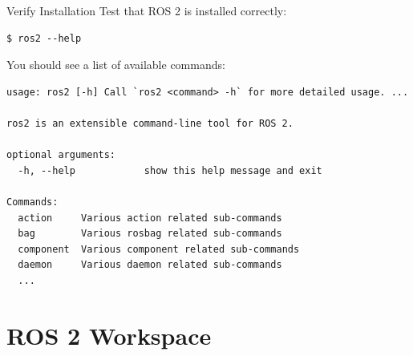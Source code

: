 \begin{frame}[fragile]{Verify Installation}
    Test that ROS 2 is installed correctly:

    \begin{lstlisting}[language=shell]
$ ros2 --help
\end{lstlisting}

    You should see a list of available commands:
    \begin{lstlisting}[language=output]
usage: ros2 [-h] Call `ros2 <command> -h` for more detailed usage. ...

ros2 is an extensible command-line tool for ROS 2.

optional arguments:
  -h, --help            show this help message and exit

Commands:
  action     Various action related sub-commands
  bag        Various rosbag related sub-commands
  component  Various component related sub-commands
  daemon     Various daemon related sub-commands
  ...
\end{lstlisting}
\end{frame}

\section{ROS 2 Workspace}

